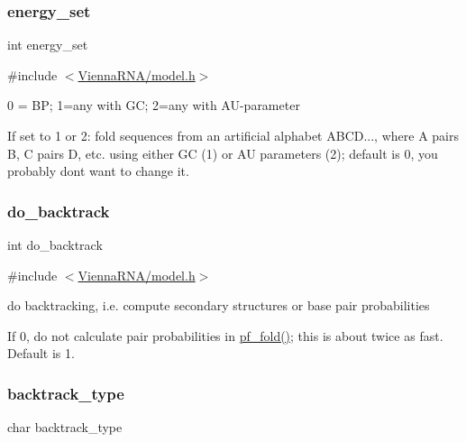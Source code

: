 \subsubsection{\texorpdfstring{energy\+\_\+set}{energy\_set}}
{\footnotesize\ttfamily int energy\+\_\+set}



{\ttfamily \#include $<$\hyperlink{model_8h}{Vienna\+R\+N\+A/model.\+h}$>$}



0 = BP; 1=any with GC; 2=any with A\+U-\/parameter 

If set to 1 or 2\+: fold sequences from an artificial alphabet A\+B\+CD..., where A pairs B, C pairs D, etc. using either GC (1) or AU parameters (2); default is 0, you probably don\textquotesingle{}t want to change it. \mbox{\label{group__model__details_gad512b5dd4dbec60faccfe137bb474489}} 
\subsubsection{\texorpdfstring{do\+\_\+backtrack}{do\_backtrack}}
{\footnotesize\ttfamily int do\+\_\+backtrack}



{\ttfamily \#include $<$\hyperlink{model_8h}{Vienna\+R\+N\+A/model.\+h}$>$}



do backtracking, i.\+e. compute secondary structures or base pair probabilities 

If 0, do not calculate pair probabilities in \hyperlink{group__part__func__global__deprecated_gadc3db3d98742427e7001a7fd36ef28c2}{pf\+\_\+fold()}; this is about twice as fast. Default is 1. \mbox{\label{group__model__details_ga83bdb43472a259c71e69fa9f70f420c3}} 
\subsubsection{\texorpdfstring{backtrack\+\_\+type}{backtrack\_type}}
{\footnotesize\ttfamily char backtrack\+\_\+type}



